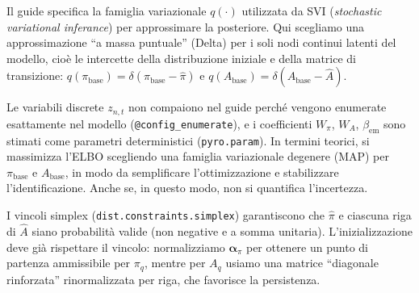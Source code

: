 \documentclass[
  italian,
  a4paper,
  a4paper,
  twoside,
  open=right,
  12pt]{scrbook}
\theoremstyle{definition}
\theoremstyle{remark}
\begin{document}
Il guide specifica la famiglia variazionale \(q(\cdot)\) utilizzata da
SVI (\emph{stochastic variational inferance}) per approssimare la
posteriore. Qui scegliamo una approssimazione ``a massa puntuale''
(Delta) per i soli nodi continui latenti del modello, cioè le intercette
della distribuzione iniziale e della matrice di transizione:
\(q(\pi_{\text{base}})=\delta(\pi_{\text{base}}-\hat\pi)\) e
\(q(A_{\text{base}})=\delta(A_{\text{base}}-\hat A)\).

Le variabili discrete \(z_{n,t}\) non compaiono nel guide perché vengono
enumerate esattamente nel modello (\texttt{@config\_enumerate}), e i
coefficienti \(W_\pi\), \(W_A\), \(\beta_{\text{em}}\) sono stimati come
parametri deterministici (\texttt{pyro.param}). In termini teorici, si
massimizza l'ELBO scegliendo una famiglia variazionale degenere (MAP)
per \(\pi_{\text{base}}\) e \(A_{\text{base}}\), in modo da semplificare
l'ottimizzazione e stabilizzare l'identificazione. Anche se, in questo
modo, non si quantifica l'incertezza.

I vincoli simplex (\texttt{dist.constraints.simplex}) garantiscono che
\(\hat\pi\) e ciascuna riga di \(\hat A\) siano probabilità valide (non
negative e a somma unitaria). L'inizializzazione deve già rispettare il
vincolo: normalizziamo \(\boldsymbol{\alpha}_\pi\) per ottenere un punto
di partenza ammissibile per \(\pi_q\), mentre per \(A_q\) usiamo una
matrice ``diagonale rinforzata'' rinormalizzata per riga, che favorisce
la persistenza.
\end{document}

